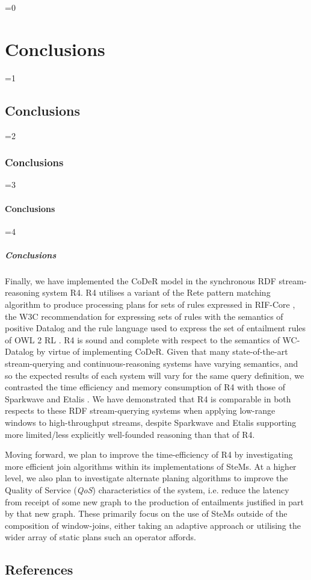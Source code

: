 \documentclass[twocolumn,preprint,3p,number]{elsarticle}
\theoremstyle{plain}
\theoremstyle{definition}
\newcounter{nestingdepth}
\newenvironment{nestedsection}[2]{
  \ifnum\value{nestingdepth}=0
    \chapter{#1}
  \else
    \ifnum\value{nestingdepth}=1
      \section{#1}
    \else
      \ifnum\value{nestingdepth}=2
        \subsection{#1}
      \else
        \ifnum\value{nestingdepth}=3
          \subsubsection{#1}
        \else
          \ifnum\value{nestingdepth}=4
            \paragraph{#1}
          \else
            \PackageError{nestedsections}{Maximum nesting level exceeded!}{uh oh!}
          \fi
        \fi
      \fi
    \fi
  \fi
  \addtocounter{nestingdepth}{1}
  \label{sec:#2}
}{\addtocounter{nestingdepth}{-1}}
\begin{document}
\begin{nestedsection}{Conclusions}{conclusions}
  Finally, we have implemented the CoDeR model in the synchronous RDF stream-reasoning system R4.
  R4 utilises a variant of the Rete pattern matching algorithm \citep{forgy79} to produce processing plans for sets of rules expressed in RIF-Core \citep{w3crifcore}, the W3C recommendation for expressing sets of rules with the semantics of positive Datalog and the rule language used to express the set of entailment rules of OWL 2 RL \citep{w3cowl2profiles}.
  R4 is sound and complete with respect to the semantics of WC-Datalog by virtue of implementing CoDeR.
  Given that many state-of-the-art stream-querying and continuous-reasoning systems have varying semantics, and so the expected results of each system will vary for the same query definition, we contrasted the time efficiency and memory consumption of R4 with those of Sparkwave \citep{sparkwave} and Etalis \citep{EP-SPARQL}.
  We have demonstrated that R4 is comparable in both respects to these RDF stream-querying systems when applying low-range windows to high-throughput streams, despite Sparkwave and Etalis supporting more limited/less explicitly well-founded reasoning than that of R4.

  Moving forward, we plan to improve the time-efficiency of R4 by investigating more efficient join algorithms within its implementations of SteMs.
  At a higher level, we also plan to investigate alternate planing algorithms to improve the Quality of Service (\emph{QoS}) characteristics of the system, i.e. reduce the latency from receipt of some new graph to the production of entailments justified in part by that new graph.
  These primarily focus on the use of SteMs outside of the composition of window-joins, either taking an adaptive approach \citep{eddies,CACQ,CQELS} or utilising the wider array of static plans such an operator affords.
\end{nestedsection}

  \section*{References}
	
	
\end{document}

